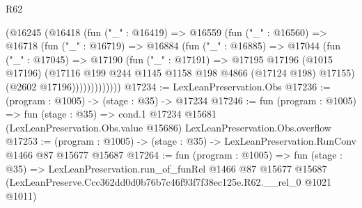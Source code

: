 \begin{lexlean}{R62}
\begin{coremodule}
            (@16245
              (@16418
                (fun ("_" : @16419) =>
                @16559
                  (fun ("_" : @16560) =>
                  @16718
                    (fun ("_" : @16719) =>
                    @16884
                      (fun ("_" : @16885) =>
                      @17044
                        (fun ("_" : @17045) =>
                        @17190
                          (fun ("_" : @17191) =>
                          @17195
                            @17196
                            (@1015 @17196)
                            (@17116 @199 @244 @1145 @1158 @198 @4866 (@17124 @198) @17155)
                            (@2602 @17196)))))))))))))
@17234 := LexLeanPreservation.Obs
@17236 := (program : @1005) -> (stage : @35) -> @17234
@17246 := fun (program : @1005) =>
  fun (stage : @35) =>
  cond.{1} @17234 @15681 (LexLeanPreservation.Obs.value @15686) LexLeanPreservation.Obs.overflow
@17253 := (program : @1005) -> (stage : @35) -> LexLeanPreservation.RunConv @1466 @87 @15677 @15687
@17264 := fun (program : @1005) =>
  fun (stage : @35) =>
  LexLeanPreservation.run_of_funRel
    @1466
    @87
    @15677
    @15687
    (LexLeanPreserve.Ccc362dd0d0b76b7c46f93f7f38ec125e.R62.__rel_0 @1021 @1011)
\end{coremodule}
\end{lexlean}

